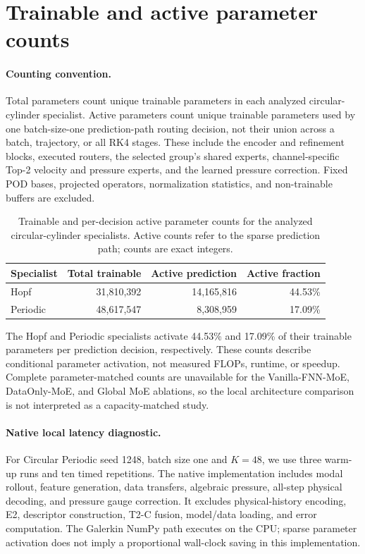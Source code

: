 \documentclass{article}
\begin{document}
\clearpage
\section{Trainable and active parameter counts}
\label{app:parameter_counts}

\paragraph{Counting convention.}
Total parameters count unique trainable parameters in each analyzed
circular-cylinder specialist. Active parameters count unique trainable
parameters used by one batch-size-one prediction-path routing decision,
not their union across a batch, trajectory, or all RK4 stages. These include
the encoder and refinement blocks, executed routers, the selected group's
shared experts, channel-specific Top-2 velocity and pressure experts, and
the learned pressure correction. Fixed POD bases, projected operators,
normalization statistics, and non-trainable buffers are excluded.

\par
\begin{table}[H]
\centering
\caption{Trainable and per-decision active parameter counts for the analyzed
circular-cylinder specialists. Active counts refer to the sparse prediction
path; counts are exact integers.}
\label{tab:parameter_counts}
\begin{tabular}{lrrr}
\toprule
Specialist & Total trainable & Active prediction & Active fraction \\
\midrule
Hopf & 31,810,392 & 14,165,816 & 44.53\% \\
Periodic & 48,617,547 & 8,308,959 & 17.09\% \\
\bottomrule
\end{tabular}
\end{table}
\par

The Hopf and Periodic specialists activate 44.53\% and 17.09\% of their
trainable parameters per prediction decision, respectively. These counts
describe conditional parameter activation, not measured FLOPs, runtime,
or speedup. Complete parameter-matched counts are unavailable for the
Vanilla-FNN-MoE, DataOnly-MoE, and Global MoE ablations, so the local
architecture comparison is not interpreted as a capacity-matched study.

\paragraph{Native local latency diagnostic.}
For Circular Periodic seed 1248, batch size one and $K=48$, we use three
warm-up runs and ten timed repetitions. The native implementation
includes modal rollout, feature generation, data transfers, algebraic
pressure, all-step physical decoding, and pressure gauge correction.
It excludes physical-history encoding, E2, descriptor construction,
T2-C fusion, model/data loading, and error computation. The Galerkin
NumPy path executes on the CPU; sparse parameter activation does not
imply a proportional wall-clock saving in this implementation.
\end{document}
